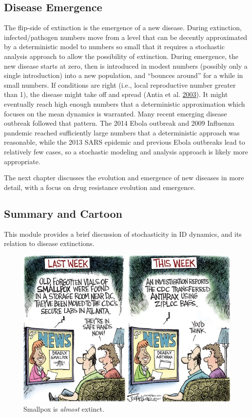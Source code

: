 \documentclass[]{article}
\theoremstyle{definition}
\theoremstyle{definition}
\theoremstyle{definition}
\theoremstyle{remark}
\begin{document}
\subsection{Disease Emergence}\label{disease-emergence}

The flip-side of extinction is the emergence of a new disease. During
extinction, infected/pathogen numbers move from a level that can be
decently approximated by a deterministic model to numbers so small that
it requires a stochastic analysis approach to allow the possibility of
extinction. During emergence, the new disease starts at zero, then is
introduced in modest numbers (possibly only a single introduction) into
a new population, and ``bounces around'' for a while in small numbers.
If conditions are right (i.e., local reproductive number greater than
1), the disease might take off and spread (Antia et al.
\protect\hyperlink{ref-antia03}{2003}). It might eventually reach high
enough numbers that a deterministic approximation which focuses on the
mean dynamics is warranted. Many recent emerging disease outbreak
followed that pattern. The 2014 Ebola outbreak and 2009 Influenza
pandemic reached sufficiently large numbers that a deterministic
approach was reasonable, while the 2013 SARS epidemic and previous Ebola
outbreaks lead to relatively few cases, so a stochastic modeling and
analysis approach is likely more appropriate.

The next chapter discusses the evolution and emergence of new diseases
in more detail, with a focus on drug resistance evolution and emergence.

\subsection{Summary and Cartoon}\label{summary-and-cartoon-11}

This module provides a brief discussion of stochasticity in ID dynamics,
and its relation to disease extinctions.

\begin{figure}
\centering
\includegraphics{./images/smallpox.jpg}
\caption{Smallpox is \emph{almost} extinct.}
\end{figure}
\end{document}
